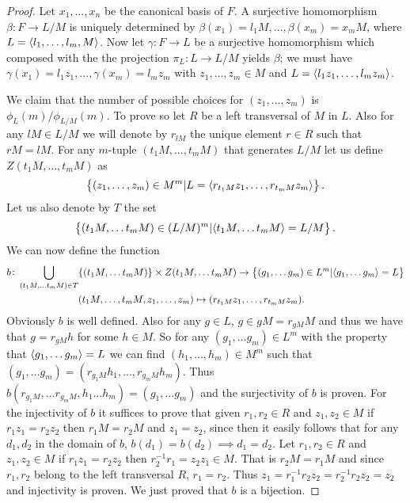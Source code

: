 \begin{proof}
    Let $x_1,\ldots , x_n$ be the canonical basis of $F$. 
    A surjective homomorphism $\beta : F \longrightarrow L/M$ is uniquely determined by $\beta(x_1) = l_1M, \ldots , \beta(x_m) = x_mM$, where $L = \langle l_1,\ldots ,l_m, M \rangle$. 
    Now let $\gamma : F \longrightarrow L$ be a surjective homomorphism which composed with the the projection $\pi_L \colon L \longrightarrow L/M$ yields $\beta$; we must have $\gamma(x_1) = l_1z_1,\ldots ,\gamma(x_m)=l_mz_m$ with $z_1,\ldots , z_m \in M$ and $L = \langle l_1z_1,\ldots ,l_mz_m \rangle$.

    We claim that the number of possible choices for $(z_1,\ldots ,z_m)$ is $\phi_L(m)/\phi_{L/M}(m)$. To prove so let $R$ be a left transversal of $M$ in $L$. Also for any $lM \in L/M$ we will denote by $r_{lM}$ the unique element $r \in R$ such that $rM = lM$. For any  $m$-tuple $(t_1M, \ldots , t_mM)$ that generates $L/M$ let us define $Z(t_1M, \ldots , t_mM)$ as
    $$
    \left\{ (z_1,\ldots, z_m) \in M^m | L = \langle r_{t_1M}z_1, \ldots , r_{t_mM}z_m \rangle \right\}.
    $$
    Let us also denote by $T$ the set
    $$
    \left\{ (t_1M, \ldots  t_mM) \in (L/M)^m | \langle t_1M, \ldots  t_mM \rangle = L/M \right\}.
    $$
    We can now define the function
    \begin{align*}
        b \colon \bigcup_{(t_1M, \ldots  t_mM) \in T}&\{(t_1M, \ldots  t_mM)\} \times Z(t_1M, \ldots  t_mM) \rightarrow \left\{ (g_1,\ldots g_m) \in L^m | \langle g_1,\ldots g_m \rangle = L \right\} \\
        & (t_1M, \ldots , t_mM, z_1,\ldots ,z_m) \mapsto (r_{t_1M}z_1, \ldots , r_{t_mM}z_m).
    \end{align*}
    Obviously $b$ is well defined. Also for any $g \in L$, $g \in gM=r_{gM}M$ and thus we have that $g = r_{gM}h$ for some $h \in M$. So for any $(g_1,\ldots g_m) \in L^m$ with the property that $\langle g_1,\ldots g_m \rangle = L$ we can find $(h_1,\ldots,h_m) \in M^m$ such that $(g_1,\ldots g_m) = (r_{g_1M}h_1,\ldots, r_{g_mM}h_m)$. Thus $b(r_{g_1M},\ldots r_{g_mM}, h_1 \ldots h_m) = (g_1,\ldots g_m)$ and the surjectivity of $b$ is proven.
    For the injectivity of $b$ it suffices to prove that given $r_1, r_2 \in R$ and $z_1, z_2 \in M$ if $r_1z_1 = r_2z_2$ then $r_1M = r_2M$ and $z_1 = z_2$, since then it easily follows that for any $d_1, d_2$ in the domain of $b$, $b(d_1) = b(d_2) \implies d_1 = d_2$.
    Let $r_1, r_2 \in R$ and $z_1, z_2 \in M$ if $r_1z_1 = r_2z_2$ then $r_2^{-1}r_1 = z_2z_1 \in M$. That is $r_2M = r_1M$ and since $r_1,r_2$ belong to the left transversal $R$, $r_1 = r_2$. Thus $z_1 = r_1^{-1}r_2z_2 = r_2^{-1}r_2z_2 = z_2$ and injectivity is proven.
    We just proved that $b$ is a bijection.
    

\end{proof}
